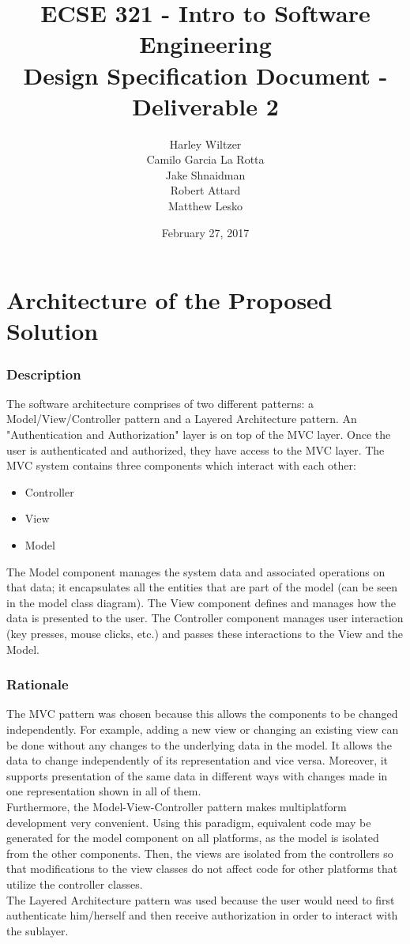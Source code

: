 \documentclass[12pt]{report}
\title{ECSE 321 - Intro to Software Engineering\\Design Specification Document - Deliverable 2}
\author{Harley Wiltzer\\Camilo Garcia La Rotta\\Jake Shnaidman\\Robert Attard\\Matthew Lesko}
\date{February 27, 2017}
\begin{document}
\maketitle
\newpage
{} %
\tableofcontents
\part{Architecture of the Proposed Solution}
\section{Description}
	The software architecture comprises of two different patterns: a Model/View/Controller pattern
	and a Layered Architecture pattern. An "Authentication and Authorization" layer is on top of the
	MVC layer. Once the user is authenticated and authorized, they have access to the MVC layer. The
	MVC system contains three components which interact with each other: 
	\begin{itemize}
		\item Controller
		\item View
		\item Model
	\end{itemize}
	The Model component manages the system data and associated operations on that data; it
	encapsulates all the entities that are part of the model (can be seen in the model class
	diagram). The View component defines and manages how the data is presented to the user. The
	Controller component manages user interaction (key presses, mouse clicks, etc.) and passes these
	interactions to the View and the Model.
\section{Rationale}
	The MVC pattern was chosen because this allows the components to be changed independently. For
	example, adding a new view or changing an existing view can be done without any changes to the
	underlying data in the model. It allows the data to change independently of its representation
	and vice versa. Moreover, it supports presentation of the same data in different ways with changes made in
	one representation shown in all of them. \\
	Furthermore, the Model-View-Controller pattern makes multiplatform development very convenient.
	Using this paradigm, equivalent code may be generated for the model component on all platforms,
	as the model is isolated from the other components. Then, the views are isolated from the
	controllers so that modifications to the view classes do not affect code for other platforms
	that utilize the controller classes.\\
	The Layered Architecture pattern was used because the user would need to first authenticate
	him/herself and then receive authorization in order to interact with the sublayer.
	\newpage
\end{document}
